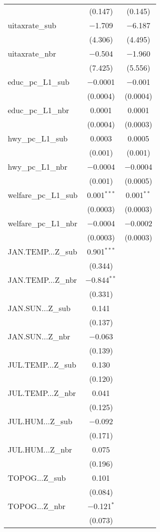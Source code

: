 \begin{table}[!htbp]
\begin{tabular}{@{\extracolsep{5pt}}lcc}
  & (0.147) & (0.145) \\ 
  uitaxrate\_sub & $-$1.709 & $-$6.187 \\ 
  & (4.306) & (4.495) \\ 
  uitaxrate\_nbr & $-$0.504 & $-$1.960 \\ 
  & (7.425) & (5.556) \\ 
  educ\_pc\_L1\_sub & $-$0.0001 & $-$0.001 \\ 
  & (0.0004) & (0.0004) \\ 
  educ\_pc\_L1\_nbr & 0.0001 & 0.0001 \\ 
  & (0.0004) & (0.0003) \\ 
  hwy\_pc\_L1\_sub & 0.0003 & 0.0005 \\ 
  & (0.001) & (0.001) \\ 
  hwy\_pc\_L1\_nbr & $-$0.0004 & $-$0.0004 \\ 
  & (0.001) & (0.0005) \\ 
  welfare\_pc\_L1\_sub & 0.001$^{***}$ & 0.001$^{**}$ \\ 
  & (0.0003) & (0.0003) \\ 
  welfare\_pc\_L1\_nbr & $-$0.0004 & $-$0.0002 \\ 
  & (0.0003) & (0.0003) \\ 
  JAN.TEMP...Z\_sub & 0.901$^{***}$ &  \\ 
  & (0.344) &  \\ 
  JAN.TEMP...Z\_nbr & $-$0.844$^{**}$ &  \\ 
  & (0.331) &  \\ 
  JAN.SUN...Z\_sub & 0.141 &  \\ 
  & (0.137) &  \\ 
  JAN.SUN...Z\_nbr & $-$0.063 &  \\ 
  & (0.139) &  \\ 
  JUL.TEMP...Z\_sub & 0.130 &  \\ 
  & (0.120) &  \\ 
  JUL.TEMP...Z\_nbr & 0.041 &  \\ 
  & (0.125) &  \\ 
  JUL.HUM...Z\_sub & $-$0.092 &  \\ 
  & (0.171) &  \\ 
  JUL.HUM...Z\_nbr & 0.075 &  \\ 
  & (0.196) &  \\ 
  TOPOG...Z\_sub & 0.101 &  \\ 
  & (0.084) &  \\ 
  TOPOG...Z\_nbr & $-$0.121$^{*}$ &  \\ 
  & (0.073) &  \\ 

\end{tabular}
\end{table}
